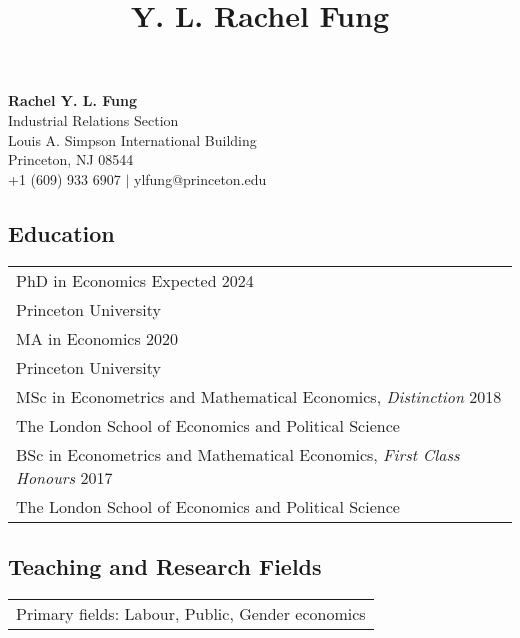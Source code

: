 \documentclass[letterpaper]{article}
\title{Y. L. Rachel Fung}
\author{}
\date{}
\begin{document}


\begin{center}
\vspace{-6em}
    \LARGE \textbf{Rachel Y. L. Fung}\textbf{} \\ \vspace{0.6\baselineskip}
    \normalsize
    Industrial Relations Section \\
    Louis A. Simpson International Building\\
    Princeton, NJ 08544 \\ 
    +1 (609) 933 6907 $|$ ylfung@princeton.edu
\end{center}

\medskip

\noindent
\subsection*{Education}
\begin{tabularx}{\textwidth}{X}
PhD in Economics \hfill Expected 2024 \\
Princeton University \\ [0.5em]
MA in Economics \hfill 2020 \\
Princeton University \\ [0.5em]
MSc in Econometrics and Mathematical Economics, \textit{Distinction} \hfill 2018 \\
The London School of Economics and Political Science \\ [0.5em]
BSc in Econometrics and Mathematical Economics, \textit{First Class Honours} \hfill 2017 \\
The London School of Economics and Political Science
\end{tabularx}

\subsection*{Teaching and Research Fields}
\begin{tabularx}{\textwidth}{X}
Primary fields: Labour, Public, Gender economics
\end{tabularx}
\end{document}
